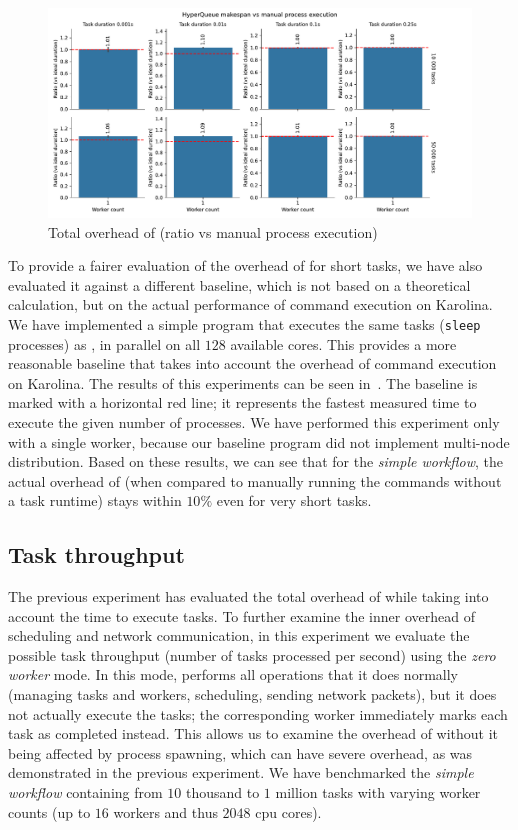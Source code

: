 \begin{figure}[h]
	\centering
	\includegraphics[width=\textwidth]{imgs/hq/charts/total-overhead-vs-manual}
	\caption{Total overhead of \hyperqueue{} (ratio vs manual process execution)}
	\label{fig:hq-overhead-vs-manual}
\end{figure}

To provide a fairer evaluation of the overhead of \hyperqueue{} for short tasks, we have
also evaluated it against a different baseline, which is not based on a theoretical calculation,
but on the actual performance of command execution on Karolina. We have implemented a simple
program that executes the same tasks (\texttt{sleep} processes) as
\hyperqueue{}, in parallel on all $128$ available cores. This provides a
more reasonable baseline that takes into account the overhead of command execution on Karolina. The
results of this experiments can be seen in~. The baseline is marked with a
horizontal red line; it represents the fastest measured time to execute the given number of
processes. We have performed this experiment only with a single worker, because our baseline
program did not implement multi-node distribution. Based on these results, we can see that for the
\emph{simple workflow}, the actual overhead of \hyperqueue{} (when compared to manually
running the commands without a task runtime) stays within $10\%$ even for very short tasks.

\subsection{Task throughput}
\label{sec:hq-exp-task-throughput}
The previous experiment has evaluated the total overhead of \hyperqueue{} while taking
into account the time to execute tasks. To further examine the inner overhead of scheduling and
network communication, in this experiment we evaluate the possible task throughput (number of tasks
processed per second) using the \emph{zero worker} mode. In this mode, \hq{}
performs all operations that it does normally (managing tasks and workers, scheduling, sending
network packets), but it does not actually execute the tasks; the corresponding worker immediately
marks each task as completed instead. This allows us to examine the overhead of
\hyperqueue{} without it being affected by process spawning, which can have severe
overhead, as was demonstrated in the previous experiment. We have benchmarked the
\emph{simple workflow} containing from $10$ thousand to $1$
million tasks with varying worker counts (up to $16$ workers and thus
$2048$ \gls{cpu} cores).

